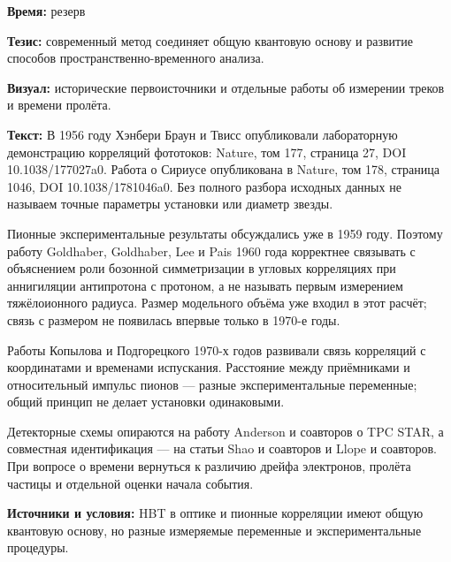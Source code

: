 \textbf{Время:} резерв

\textbf{Тезис:} современный метод соединяет общую квантовую основу и развитие способов пространственно-временного анализа.

\textbf{Визуал:} исторические первоисточники и отдельные работы об измерении треков и времени пролёта.

\textbf{Текст:} В 1956 году Хэнбери Браун и Твисс опубликовали лабораторную демонстрацию корреляций фототоков: Nature, том 177, страница 27, DOI 10.1038/177027a0. Работа о Сириусе опубликована в Nature, том 178, страница 1046, DOI 10.1038/1781046a0. Без полного разбора исходных данных не называем точные параметры установки или диаметр звезды.

Пионные экспериментальные результаты обсуждались уже в 1959 году. Поэтому работу Goldhaber, Goldhaber, Lee и Pais 1960 года корректнее связывать с объяснением роли бозонной симметризации в угловых корреляциях при аннигиляции антипротона с протоном, а не называть первым измерением тяжёлоионного радиуса. Размер модельного объёма уже входил в этот расчёт; связь с размером не появилась впервые только в 1970-е годы.

Работы Копылова и Подгорецкого 1970-х годов развивали связь корреляций с координатами и временами испускания. Расстояние между приёмниками и относительный импульс пионов — разные экспериментальные переменные; общий принцип не делает установки одинаковыми.

Детекторные схемы опираются на работу Anderson и соавторов о TPC STAR, а совместная идентификация — на статьи Shao и соавторов и Llope и соавторов. При вопросе о времени вернуться к различию дрейфа электронов, пролёта частицы и отдельной оценки начала события.

\textbf{Источники и условия:} HBT в оптике и пионные корреляции имеют общую квантовую основу, но разные измеряемые переменные и экспериментальные процедуры.
